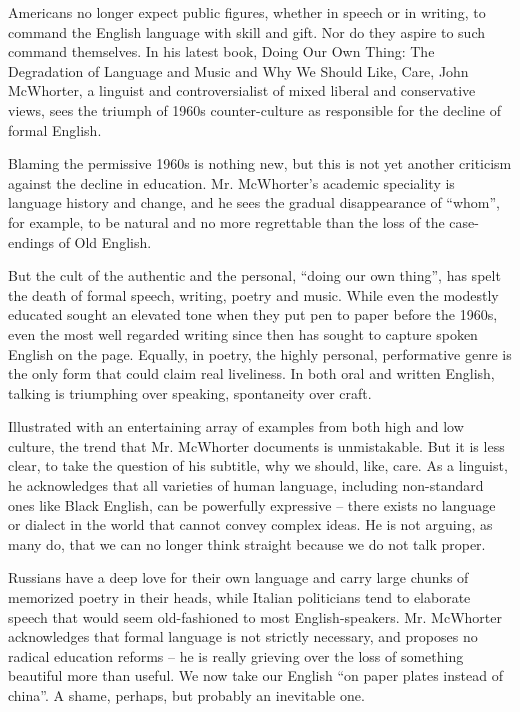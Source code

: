Americans no longer expect public figures, whether in speech or in writing, to command the English language with skill and gift. Nor do they aspire to such command themselves. In his latest book, Doing Our Own Thing: The Degradation of Language and Music and Why We Should Like, Care, John McWhorter, a linguist and controversialist of mixed liberal and conservative views, sees the triumph of 1960s counter-culture as responsible for the decline of formal English.


Blaming the permissive 1960s is nothing new, but this is not yet another criticism against the decline in education. Mr. McWhorter's academic speciality is language history and change, and he sees the gradual disappearance of ``whom'', for example, to be natural and no more regrettable than the loss of the case-endings of Old English.


But the cult of the authentic and the personal, ``doing our own thing'', has spelt the death of formal speech, writing, poetry and music. While even the modestly educated sought an elevated tone when they put pen to paper before the 1960s, even the most well regarded writing since then has sought to capture spoken English on the page. Equally, in poetry, the highly personal, performative genre is the only form that could claim real liveliness. In both oral and written English, talking is triumphing over speaking, spontaneity over craft.


Illustrated with an entertaining array of examples from both high and low culture, the trend that Mr. McWhorter documents is unmistakable. But it is less clear, to take the question of his subtitle, why we should, like, care. As a linguist, he acknowledges that all varieties of human language, including non-standard ones like Black English, can be powerfully expressive – there exists no language or dialect in the world that cannot convey complex ideas. He is not arguing, as many do, that we can no longer think straight because we do not talk proper.


Russians have a deep love for their own language and carry large chunks of memorized poetry in their heads, while Italian politicians tend to elaborate speech that would seem old-fashioned to most English-speakers. Mr. McWhorter acknowledges that formal language is not strictly necessary, and proposes no radical education reforms – he is really grieving over the loss of something beautiful more than useful. We now take our English ``on paper plates instead of china''. A shame, perhaps, but probably an inevitable one.